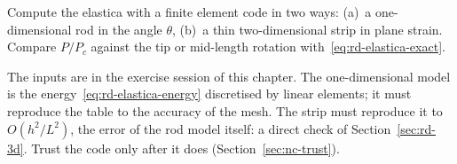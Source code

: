 \label{exo:rd-computer-fe}
%
Compute the elastica with a finite element code in two ways: (a)~a one-dimensional rod in the
angle $\theta$, (b)~a thin two-dimensional strip in plane strain. Compare $P/P_c$ against the tip or
mid-length rotation with~\eqref{eq:rd-elastica-exact}.
\begin{solution}
The inputs are in the exercise session of this chapter. The one-dimensional model is the
energy~\eqref{eq:rd-elastica-energy} discretised by linear elements; it must reproduce the table
to the accuracy of the mesh. The strip must reproduce it to $O(h^2/L^2)$, the error of the rod
model itself: a direct check of Section~\ref{sec:rd-3d}. Trust the code only after it does
(Section~\ref{sec:nc-trust}).
\end{solution}


